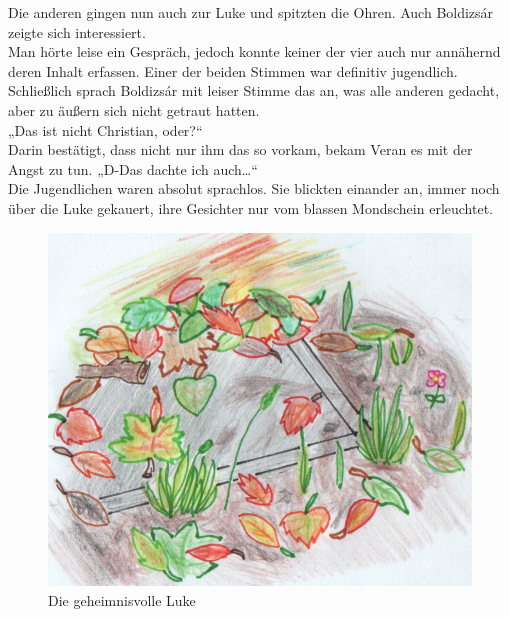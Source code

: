 \documentclass[oneside]{memoir}
\begin{document}
Die anderen gingen nun auch zur Luke und spitzten die Ohren. Auch Boldizsár zeigte sich interessiert. \\
Man hörte leise ein Gespräch, jedoch konnte keiner der vier auch nur annähernd deren Inhalt erfassen. Einer der beiden Stimmen war definitiv jugendlich. Schließlich sprach Boldizsár mit leiser Stimme das an, was alle anderen gedacht, aber zu äußern sich nicht getraut hatten. \\
„Das ist nicht Christian, oder?“ \\
Darin bestätigt, dass nicht nur ihm das so vorkam, bekam Veran es mit der Angst zu tun. „D-Das dachte ich auch\ldots“ \\
Die Jugendlichen waren absolut sprachlos. Sie blickten einander an, immer noch über die Luke gekauert, ihre Gesichter nur vom blassen Mondschein erleuchtet.

\bigskip
\begin{figure}[htbp] 
  \centering
     \includegraphics[scale=0.9]{Bilder/luke1.png}
  \caption{Die geheimnisvolle Luke}
\end{figure}
\end{document}
